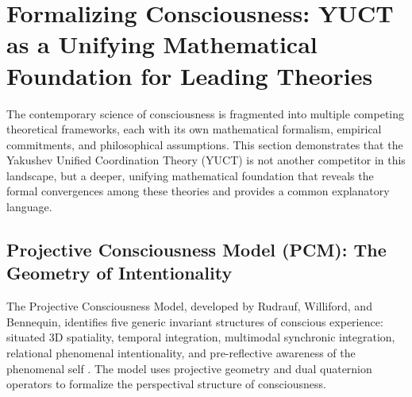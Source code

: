 \documentclass[12pt,a4paper]{article}
\begin{document}
	\section{Formalizing Consciousness: YUCT as a Unifying Mathematical Foundation for Leading Theories}
	
	The contemporary science of consciousness is fragmented into multiple competing theoretical frameworks, each with its own mathematical formalism, empirical commitments, and philosophical assumptions. This section demonstrates that the Yakushev Unified Coordination Theory (YUCT) is not another competitor in this landscape, but a deeper, unifying mathematical foundation that reveals the formal convergences among these theories and provides a common explanatory language.
	
	\subsection{Projective Consciousness Model (PCM): The Geometry of Intentionality}
	
	The Projective Consciousness Model, developed by Rudrauf, Williford, and Bennequin, identifies five generic invariant structures of conscious experience: situated 3D spatiality, temporal integration, multimodal synchronic integration, relational phenomenal intentionality, and pre-reflective awareness of the phenomenal self \cite{Rudrauf2023}. The model uses projective geometry and dual quaternion operators to formalize the perspectival structure of consciousness.
	
\end{document}
